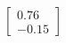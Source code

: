 \documentclass[preview]{standalone}
\begin{document}
\begin{align*}
\begin{bmatrix} 0.76 \\ -0.15 \end{bmatrix}
\end{align*}
\end{document}
